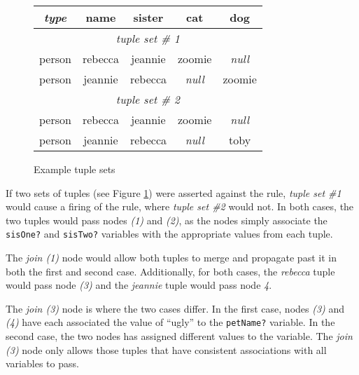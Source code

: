\setlength{\extrarowheight}{3pt}


\begin{figure}[htbpc]
  \begin{center}
    \begin{tabular}{|c||c|c|c|c|}
      \hline
        \emph{\textsf{type}} %
            & \textsf{name} %
            & \textsf{sister} %
            & \textsf{cat} %
            & \textsf{dog} \\
      \hline
      \hline
        \multicolumn{5}{|c|}{\emph{tuple set \# 1}}\\
      \hline 
      \hline 
        person & rebecca & jeannie & zoomie & \emph{null} \\
      \hline
        person & jeannie & rebecca & \emph{null} & zoomie \\
      \hline
      \hline
        \multicolumn{5}{|c|}{\emph{tuple set \# 2}}\\
      \hline
      \hline
        person & rebecca & jeannie & zoomie & \emph{null} \\
      \hline
        person & jeannie & rebecca & \emph{null} & toby \\
      \hline
    \end{tabular}
  \end{center}

  \caption{Example tuple sets}
  \label{table.tuplesets}
\end{figure}

If two sets of tuples (see Figure \ref{table.tuplesets}) were
asserted against the rule, \emph{tuple set \#1} would cause a firing
of the rule, where \emph{tuple set \#2} would not.  In both cases,
the two tuples would pass nodes \emph{(1)} and \emph{(2)}, as the
nodes simply associate the \verb|sisOne?| and \verb|sisTwo?| variables
with the appropriate values from each tuple.

The \emph{join (1)} node would allow both tuples to merge and
propagate past it in both the first and second case.  Additionally,
for both cases, the \emph{rebecca} tuple would pass node \emph{(3)}
and the \emph{jeannie} tuple would pass node \emph{4}.

The \emph{join (3)} node is where the two cases differ.  In the first
case, nodes \emph{(3)} and \emph{(4)} have each associated the value
of ``ugly'' to the \verb|petName?| variable.  In the second case, the
two nodes has assigned different values to the variable.  The
\emph{join (3)} node only allows those tuples that have consistent
associations with all variables to pass.
